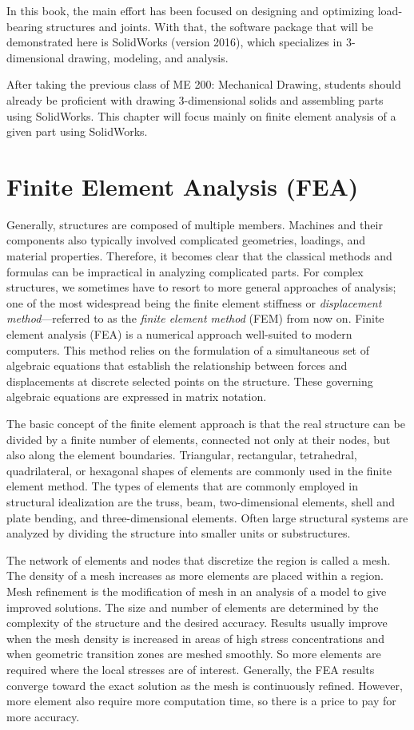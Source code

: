 \documentclass[a4paper,openany,12pt]{book}
\begin{document}
{{In this book, the main effort has been focused on designing and
optimizing load-bearing structures and joints. With that, the software
package that will be demonstrated here is SolidWorks (version 2016),
which specializes in 3-dimensional drawing, modeling, and analysis.

After taking the previous class of ME 200: Mechanical Drawing, students
should already be proficient with drawing 3-dimensional solids and
assembling parts using SolidWorks. This chapter will focus mainly on
finite element analysis of a given part using SolidWorks.

\section{Finite Element Analysis (FEA)}
\label{sec:org7689e70}
Generally, structures are composed of multiple members. Machines and
their components also typically involved complicated geometries,
loadings, and material properties. Therefore, it becomes clear that the
classical methods and formulas can be impractical in analyzing
complicated parts. For complex structures, we sometimes have to resort
to more general approaches of analysis; one of the most widespread being
the finite element stiffness or \emph{displacement method}---referred to as
the \emph{finite element method} (FEM) from now on. Finite element analysis
(FEA) is a numerical approach well-suited to modern computers. This
method relies on the formulation of a simultaneous set of algebraic
equations that establish the relationship between forces and
displacements at discrete selected points on the structure. These
governing algebraic equations are expressed in matrix notation.

The basic concept of the finite element approach is that the real
structure can be divided by a finite number of elements, connected not
only at their nodes, but also along the element boundaries. Triangular,
rectangular, tetrahedral, quadrilateral, or hexagonal shapes of elements
are commonly used in the finite element method. The types of elements
that are commonly employed in structural idealization are the truss,
beam, two-dimensional elements, shell and plate bending, and
three-dimensional elements. Often large structural systems are analyzed
by dividing the structure into smaller units or substructures.

The network of elements and nodes that discretize the region is called a
mesh. The density of a mesh increases as more elements are placed within
a region. Mesh refinement is the modification of mesh in an analysis of
a model to give improved solutions. The size and number of elements are
determined by the complexity of the structure and the desired accuracy.
Results usually improve when the mesh density is increased in areas of
high stress concentrations and when geometric transition zones are
meshed smoothly. So more elements are required where the local stresses
are of interest. Generally, the FEA results converge toward the exact
solution as the mesh is continuously refined. However, more element also
require more computation time, so there is a price to pay for more
accuracy.

}}
\end{document}
